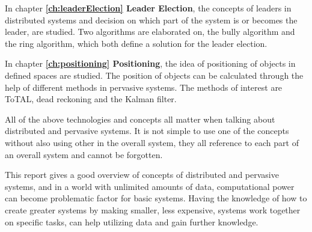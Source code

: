 In chapter \textbf{\ref{ch:leaderElection} Leader Election}, the concepts of leaders in distributed systems and decision on which part of the system is or becomes the leader, are studied. Two algorithms are elaborated on, the bully algorithm and the ring algorithm, which both define a solution for the leader election.

In chapter \textbf{\ref{ch:positioning} Positioning}, the idea of positioning of objects in defined spaces are studied. The position of objects can be calculated through the help of different methods in pervasive systems. The methods of interest are ToTAL, dead reckoning and the Kalman filter.

All of the above technologies and concepts all matter when talking about distributed and pervasive systems. It is not simple to use one of the concepts without also using other in the overall system, they all reference to each part of an overall system and cannot be forgotten.

This report gives a good overview of concepts of distributed and pervasive systems, and in a world with unlimited amounts of data, computational power can become problematic factor for basic systems. Having the knowledge of how to create greater systems by making smaller, less expensive, systems work together on specific tasks, can help utilizing data and gain further knowledge.